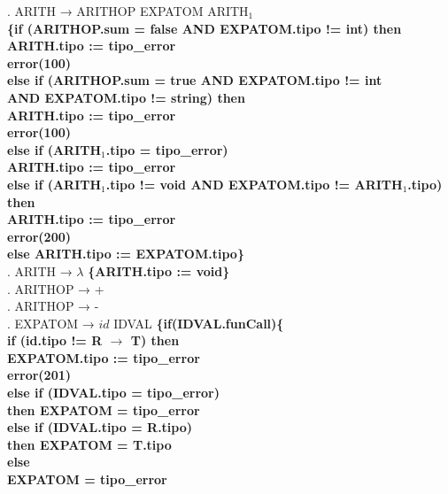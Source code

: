 \begin{tabbing}
    . ARITH → ARITHOP EXPATOM ARITH$_1$\\
    \>                     \>\textbf{\{if (ARITHOP.sum = false AND EXPATOM.tipo != int) then}\\
    \>                     \> \> \textbf{ARITH.tipo := tipo\_error}\\
    \>                     \> \> \textbf{error(100)}\\
    \> \>\textbf{else if (ARITHOP.sum = true AND EXPATOM.tipo != int}\\
    \> \> \>\textbf{AND EXPATOM.tipo != string) then}\\     
    \> \> \> \> \textbf{ARITH.tipo := tipo\_error}\\
    \> \> \> \> \textbf{error(100)}\\
    \>                     \> \textbf{else if (ARITH$_1$.tipo = tipo\_error)}\\     \> \> \> \textbf{ARITH.tipo := tipo\_error}\\
    \>                     \> \textbf{else if (ARITH$_1$.tipo != void AND EXPATOM.tipo != ARITH$_1$.tipo) then}\\ 
    \> \> \> \textbf{ARITH.tipo := tipo\_error}\\
    \>                     \> \> \textbf{error(200)}\\
    \>                     \> \textbf{else ARITH.tipo := EXPATOM.tipo\}}\\
    . ARITH → $\lambda$ \textbf{\{ARITH.tipo := void\}}\\
    . ARITHOP → +\\
    . ARITHOP → -\\
    . EXPATOM → $id$ IDVAL \textbf{\{if(IDVAL.funCall)\{}\\
    \> \> \> \textbf{if (id.tipo != R $\rightarrow$ T) then}\\
    \> \> \> \> \textbf{EXPATOM.tipo := tipo\_error}\\
    \> \> \> \> \textbf{error(201)}\\
    \> \> \> \textbf{else if (IDVAL.tipo = tipo\_error)}\\
    \> \> \> \> \textbf{then EXPATOM = tipo\_error}\\
    \> \> \> \textbf{else if (IDVAL.tipo = R.tipo)}\\
    \> \> \> \> \textbf{then EXPATOM = T.tipo}\\
    \> \> \> \textbf{else}\\
    \> \> \> \> \textbf{EXPATOM = tipo\_error}\\

\end{tabbing}
